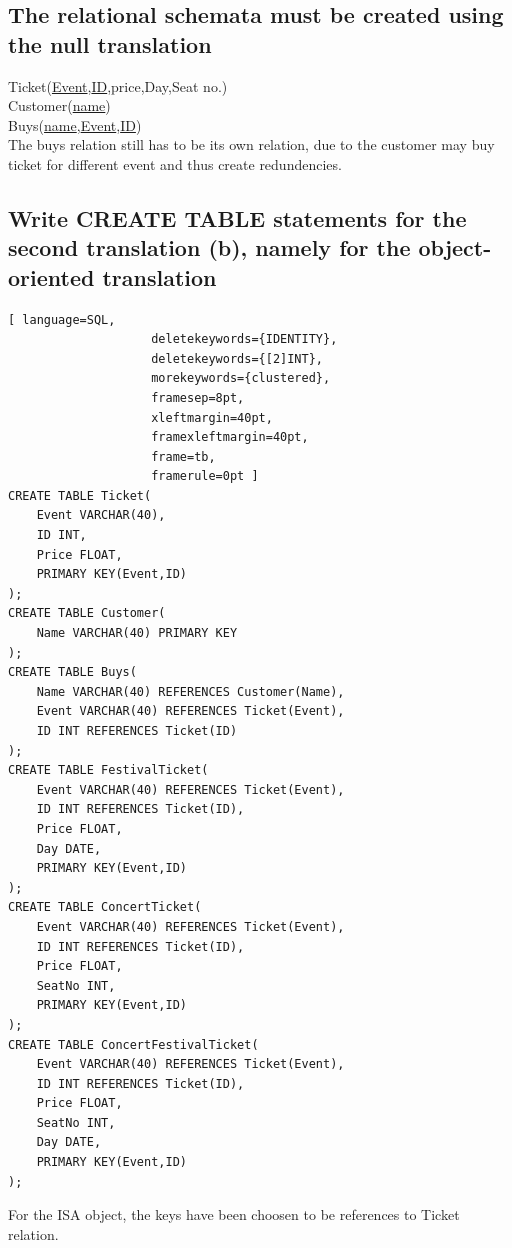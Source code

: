 \documentclass[12pt, a4paper]{article}
\newcommand{\beginSQL}{\begin{lstlisting}[ language=SQL,
                    deletekeywords={IDENTITY},
                    deletekeywords={[2]INT},
                    morekeywords={clustered},
                    framesep=8pt,
                    xleftmargin=40pt,
                    framexleftmargin=40pt,
                    frame=tb,
                    framerule=0pt ]}
\begin{document}
			\subsection{The relational schemata must be created using the null translation}
				Ticket(\underline{Event},\underline{ID},price,Day,Seat no.)\\
				Customer(\underline{name})\\
				Buys(\underline{name},\underline{Event},\underline{ID})\\
				The buys relation still has to be its own relation, due to the customer may buy ticket for different event and thus create redundencies.
			\subsection{Write CREATE TABLE statements for the second translation (b), namely for the object-oriented translation}
				\beginSQL
CREATE TABLE Ticket(
	Event VARCHAR(40),
	ID INT,
	Price FLOAT,
	PRIMARY KEY(Event,ID)
);
CREATE TABLE Customer(
	Name VARCHAR(40) PRIMARY KEY
);
CREATE TABLE Buys(
	Name VARCHAR(40) REFERENCES Customer(Name),
	Event VARCHAR(40) REFERENCES Ticket(Event),
	ID INT REFERENCES Ticket(ID)
);
CREATE TABLE FestivalTicket(
	Event VARCHAR(40) REFERENCES Ticket(Event),
	ID INT REFERENCES Ticket(ID),
	Price FLOAT,
	Day DATE,
	PRIMARY KEY(Event,ID)
);
CREATE TABLE ConcertTicket(
	Event VARCHAR(40) REFERENCES Ticket(Event),
	ID INT REFERENCES Ticket(ID),
	Price FLOAT,
	SeatNo INT,
	PRIMARY KEY(Event,ID)
);
CREATE TABLE ConcertFestivalTicket(
	Event VARCHAR(40) REFERENCES Ticket(Event),
	ID INT REFERENCES Ticket(ID),
	Price FLOAT,
	SeatNo INT,
	Day DATE,
	PRIMARY KEY(Event,ID)
);\end{lstlisting}
	For the ISA object, the keys have been choosen to be references to Ticket relation.
	\clearpage
\end{document}
